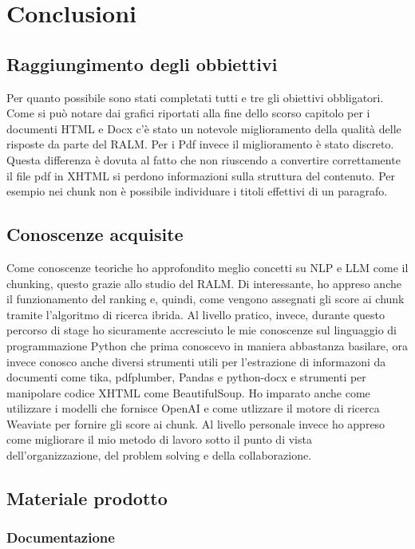\chapter{Conclusioni}
\label{cap:conclusioni}

\section{Raggiungimento degli obbiettivi}
Per quanto possibile sono stati completati tutti e tre gli obiettivi obbligatori.
Come si può notare dai grafici riportati alla fine dello scorso capitolo per i documenti HTML e Docx c'è stato un notevole miglioramento della qualità delle risposte da parte del RALM.
Per i Pdf invece il miglioramento è stato discreto.
Questa differenza è dovuta al fatto che non riuscendo a convertire correttamente il file pdf in XHTML si perdono informazioni sulla struttura del contenuto.
Per esempio nei chunk non è possibile individuare i titoli effettivi di un paragrafo.

\section{Conoscenze acquisite}
Come conoscenze teoriche ho approfondito meglio concetti su NLP e LLM come il chunking, questo grazie allo studio del RALM.
Di interessante, ho appreso anche il funzionamento del ranking e, quindi, come vengono assegnati gli score ai chunk tramite l'algoritmo di ricerca ibrida.
Al livello pratico, invece, durante questo percorso di stage ho sicuramente accresciuto le mie conoscenze sul linguaggio di programmazione Python che prima conoscevo in maniera abbastanza basilare, ora invece conosco anche diversi strumenti utili per l'estrazione di informazoni da documenti come tika, pdfplumber, Pandas e python-docx e strumenti per manipolare codice XHTML come BeautifulSoup.
Ho imparato anche come utilizzare i modelli che fornisce OpenAI e come utlizzare il motore di ricerca Weaviate per fornire gli score ai chunk.
Al livello personale invece ho appreso come migliorare il mio metodo di lavoro sotto il punto di vista dell'organizzazione, del problem solving e della collaborazione.

\section{Materiale prodotto}
\subsection{Documentazione}

